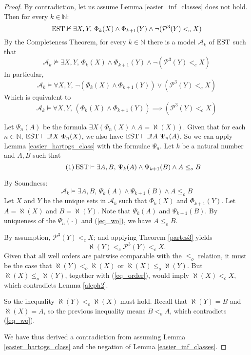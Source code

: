 \begin{proof}
	By contradiction, let us assume Lemma \ref{easier_inf_classes} does not hold. Then for every $k\in\mathbb{N}$:
	\[
		\operatorname{EST} \nvdash \exists X,Y ,\, \Phi_k (X) \land \Phi_{k+1} (Y) \land \neg(\mathcal{P}^{3}(Y) <_c X)
	\]
	By the Completeness Theorem, for every $k\in\mathbb{N}$ there is a model $\mathcal{A}_k$ of $\operatorname{EST}$ such that
	\[
		\mathcal{A}_k \nvDash \exists X,Y ,\, \Phi_k (X) \land \Phi_{k+1} (Y) \land \neg(\mathcal{P}^{3}(Y) <_c X)
	\]
	In particular,
	\[
		\mathcal{A}_k \vDash \forall X,Y ,\, \neg (\Phi_k (X) \land \Phi_{k+1} (Y)) \lor (\mathcal{P}^{3}(Y) <_c X)
	\]
	Which is equivalent to
	\[
		\mathcal{A}_k \vDash \forall X,Y , \, (\Phi_k (X) \land \Phi_{k+1} (Y)) \implies (\mathcal{P}^{3}(Y) <_c X)
	\]

	Let $\Psi_n (A)$ be the formula $\exists X (\Phi_n (X) \land A = \aleph(X))$.
	Given that for each $n\in\mathbb{N}$, $\operatorname{EST} \vdash \exists! X \ \Phi_n (X)$, we also have $\operatorname{EST} \vdash \exists! A \ \Psi_n (A)$. So we can apply Lemma \ref{easier_hartogs_class} with the formulae $\Psi_n$. Let $k$ be a natural number and $A,B$ such that 
	\begin{equation}\tag{1}
		\label{eq_wo}
		\operatorname{EST} \vdash \exists A,B, \, \Psi_k (A) \land \Psi_{k+1} (B) \land A \leq_o B
	\end{equation}

	By Soundness:	
	\[
		\mathcal{A}_k \vDash \exists A,B, \, \Psi_k (A) \land \Psi_{k+1} (B) \land A \leq_o B
	\]	
	Let $X$ and $Y$ be the unique sets in $\mathcal{A}_k$ such that $\Phi_k (X)$ and $\Phi_{k+1} (Y)$. Let $A = \aleph(X)$ and $B = \aleph(Y)$.
	Note that $\Psi_k (A)$ and $\Psi_{k+1} (B)$. By uniqueness of the $\Psi_n (\cdot)$ and (\ref{eq_wo}), we have $A \leq_o B$.

	By assumption, $\mathcal{P}^{3}(Y) <_c X$; and applying Theorem \ref{partes3} yields
	\begin{equation}\tag{2}
		\label{eq_order}
		\aleph(Y) <_c \mathcal{P}^{3} (Y) <_c X. 
	\end{equation}
	Given that all well orders are pairwise comparable with the $\leq_o$ relation, it must be the case that $\aleph(Y) <_o \aleph(X)$ or $\aleph(X) \leq_o \aleph(Y)$.
	But $\aleph(X) \leq_o \aleph(Y)$, together with (\ref{eq_order}), would imply $\aleph(X) <_c X$, which contradicts Lemma \ref{aleph2}.
	
	So the inequality $\aleph(Y) <_o \aleph(X)$  must hold. Recall that $\aleph(Y) = B$ and $\aleph(X) = A$, so the previous inequality means $B <_o A$, which contradicts (\ref{eq_wo}).
	
	We have thus derived a contradiction from assuming Lemma \ref{easier_hartogs_class} and the negation of Lemma \ref{easier_inf_classes}.
\end{proof}

